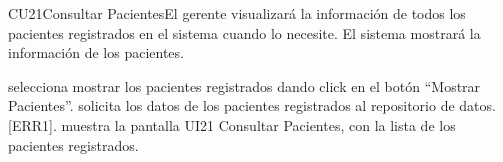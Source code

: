 \begin{UseCase}{CU21}{Consultar Pacientes}{El gerente visualizará la información de todos los pacientes registrados en el sistema cuando lo necesite. El sistema mostrará la información de los pacientes.}
	
\end{UseCase}

\begin{UCtrayectoria}{}
		\UCpaso[\UCactor] selecciona mostrar los pacientes registrados dando click en el botón ``Mostrar Pacientes''.
		\UCpaso solicita los datos de los pacientes registrados al repositorio de datos. [ERR1].
		\UCpaso muestra la pantalla UI21 Consultar Pacientes, con la lista de los pacientes registrados.
\end{UCtrayectoria}
